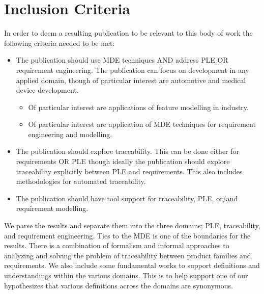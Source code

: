 \section{Inclusion Criteria}

In order to deem a resulting publication to be relevant to this body of work the following criteria needed to be met:
\begin{itemize}
	\item The publication should use \ac{MDE} techniques AND address \ac{PLE} OR requirement engineering. The publication can focus on development in any applied domain, though of particular interest are automotive and medical device development. 
	\begin{itemize}
		\item Of particular interest are applications of feature modelling in industry. 
		\item Of particular interest are application of \ac{MDE} techniques for requirement engineering and modelling.
	\end{itemize}
	\item The publication should explore traceability. This can be done either for requirements OR \ac{PLE} though ideally the publication should explore traceability explicitly between \ac{PLE} and requirements. This also includes methodologies for automated traceability.
	\item The publication should have tool support for traceability, \ac{PLE}, or/and requirement modelling. 
\end{itemize}

We parse the results and separate them into the three domains; \ac{PLE}, traceability, and requirement engineering. Ties to the \ac{MDE} is one of the boundaries for the results. There is a combination of formalism and informal approaches to analyzing and solving the problem of traceability between product families and requirements. We also include some fundamental works to support definitions and understandings within the various domains. This is to help support one of our hypothesizes that various definitions across the domains are synonymous. 






